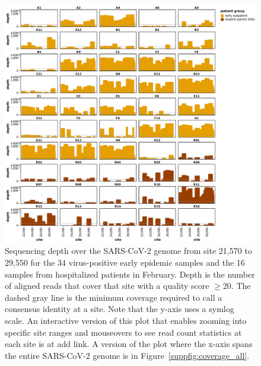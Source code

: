 \documentclass[9pt,twocolumn,twoside]{gsajnl_modified}
\begin{document}
\begin{figure}[h!]
\centering
\includegraphics[width=\linewidth]{figures/coverage_region.pdf}
\caption{Sequencing depth over the SARS-CoV-2 genome from site 21,570 to 29,550 for the 34 virus-positive early epidemic samples and the 16 samples from hospitalized patients in February.
Depth is the number of aligned reads that cover that site with a quality score $\ge$20.
The dashed gray line is the minimum coverage required to call a consensus identity at a site.
Note that the y-axis uses a symlog scale.
An interactive version of this plot that enables zooming into specific site ranges and mouseovers to see read count statistics at each site is at {\color{red} add link}.
A version of the plot where the x-axis spans the entire SARS-CoV-2 genome is in Figure~\ref{suppfig:coverage_all}.
}
\label{suppfig:coverage}
\end{figure}
\end{document}
